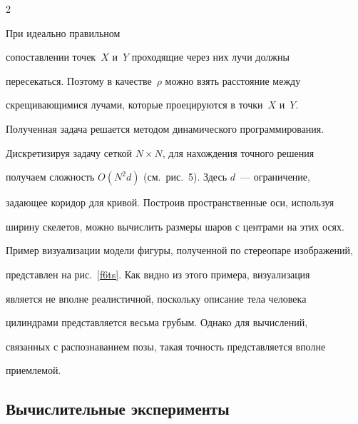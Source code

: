 \begin{multicols}{2}
\begin{figure}[b]
\begin{center}
{\epsfxsize=164.469mm


}

\end{center}

\vspace*{-6pt}


\end{figure}

При идеально правильном 

сопоставлении точек~$X$ и~$Y$ проходящие через них лучи должны 

пересекаться. Поэтому в качестве~$\rho$ можно взять расстояние между 

скрещивающимися лучами, которые проецируются в точки~$X$ и~$Y$.

     

     Полученная задача решается методом динамического программирования. 

Дискретизируя задачу сеткой $N\times N$, для нахождения точного решения 

получаем сложность $O(N^2d)$ (см.\ рис.~5). Здесь $d$~--- ограничение, 

задающее коридор для кривой. Построив пространственные оси, используя 

ширину скелетов, можно вычислить размеры шаров с центрами на этих осях. 

     



      

Пример визуализации модели фигуры, полученной по стереопаре изображений, 

представлен на рис.~\ref{f6ts}. Как видно из этого примера, визуализация 

является не вполне реалистичной, поскольку описание тела человека 

цилиндрами представляется весьма грубым. Однако для вычислений, 

связанных с распознаванием позы, такая точность представляется вполне 

приемлемой. 



\subsection{Вычислительные эксперименты} %




\end{multicols}
